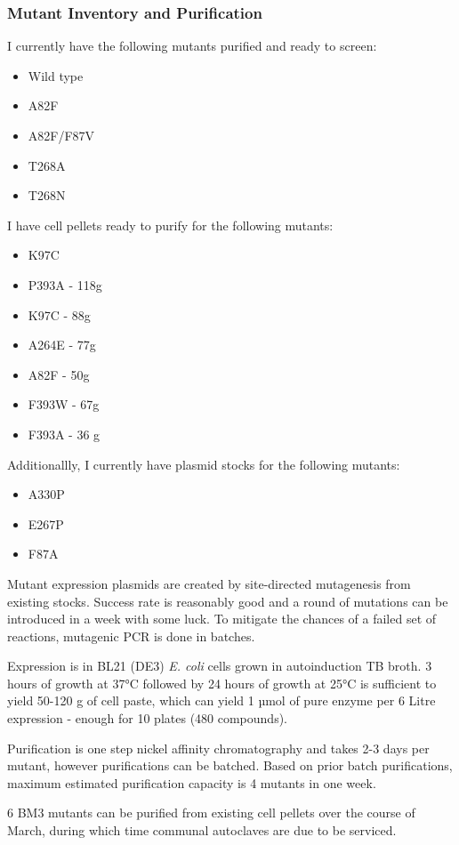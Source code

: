 \documentclass{article}
\begin{document}
\subsubsection{Mutant Inventory and Purification}
I currently have the following mutants purified and ready to screen: %
\begin{itemize}
	\item Wild type
	\item A82F
	\item A82F/F87V
	\item T268A 
	\item T268N 
\end{itemize}
I have cell pellets ready to purify for the following mutants:
\begin{itemize}
	\item K97C
	\item P393A - 118g
	\item K97C - 88g
	\item A264E - 77g
	\item A82F - 50g
	\item F393W - 67g
	\item F393A - 36 g
\end{itemize}
Additionallly, I currently have plasmid stocks for the following mutants:
\begin{itemize}
	\item A330P
	\item E267P
	\item F87A
\end{itemize}
\par
Mutant expression plasmids are created by site-directed mutagenesis from existing stocks. Success rate is reasonably good and a round of mutations can be introduced in a week with some luck. To mitigate the chances of a failed set of reactions, mutagenic PCR is done in batches.
\par
Expression is in BL21 (DE3) \textit{E. coli} cells grown in autoinduction TB broth. 3 hours of growth at 37°C followed by 24 hours of growth at 25°C is sufficient to yield 50-120 g of cell paste, which can yield 1 µmol of pure enzyme per 6 Litre expression - enough for 10 plates (480 compounds). %
\par
Purification is one step nickel affinity chromatography and takes 2-3 days per mutant, however purifications can be batched. Based on prior batch purifications, maximum estimated purification capacity is 4 mutants in one week. %
\par
6 BM3 mutants can be purified from existing cell pellets over the course of March, during which time communal autoclaves are due to be serviced. %
\end{document}
